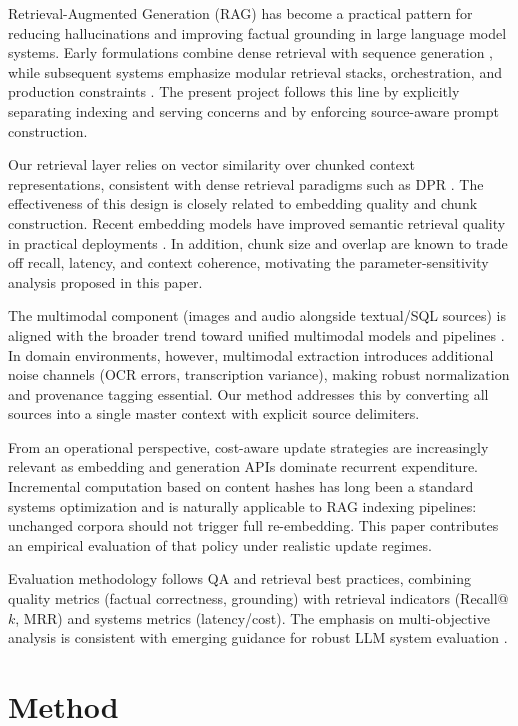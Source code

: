 \documentclass[11pt,a4paper]{article}
\begin{document}
Retrieval-Augmented Generation (RAG) has become a practical pattern for reducing hallucinations and improving factual grounding in large language model systems. Early formulations combine dense retrieval with sequence generation \cite{lewis2020rag}, while subsequent systems emphasize modular retrieval stacks, orchestration, and production constraints \cite{gao2023retrieval,siriwardhana2023improving}. The present project follows this line by explicitly separating indexing and serving concerns and by enforcing source-aware prompt construction.

Our retrieval layer relies on vector similarity over chunked context representations, consistent with dense retrieval paradigms such as DPR \cite{karpukhin2020dpr}. The effectiveness of this design is closely related to embedding quality and chunk construction. Recent embedding models have improved semantic retrieval quality in practical deployments \cite{openai2024embeddings}. In addition, chunk size and overlap are known to trade off recall, latency, and context coherence, motivating the parameter-sensitivity analysis proposed in this paper.

The multimodal component (images and audio alongside textual/SQL sources) is aligned with the broader trend toward unified multimodal models and pipelines \cite{openai2023gpt4v}. In domain environments, however, multimodal extraction introduces additional noise channels (OCR errors, transcription variance), making robust normalization and provenance tagging essential. Our method addresses this by converting all sources into a single master context with explicit source delimiters.

From an operational perspective, cost-aware update strategies are increasingly relevant as embedding and generation APIs dominate recurrent expenditure. Incremental computation based on content hashes has long been a standard systems optimization and is naturally applicable to RAG indexing pipelines: unchanged corpora should not trigger full re-embedding. This paper contributes an empirical evaluation of that policy under realistic update regimes.

Evaluation methodology follows QA and retrieval best practices, combining quality metrics (factual correctness, grounding) with retrieval indicators (Recall@$k$, MRR) and systems metrics (latency/cost). The emphasis on multi-objective analysis is consistent with emerging guidance for robust LLM system evaluation \cite{chang2024survey,ragas2024}.

\section{Method}
\end{document}
